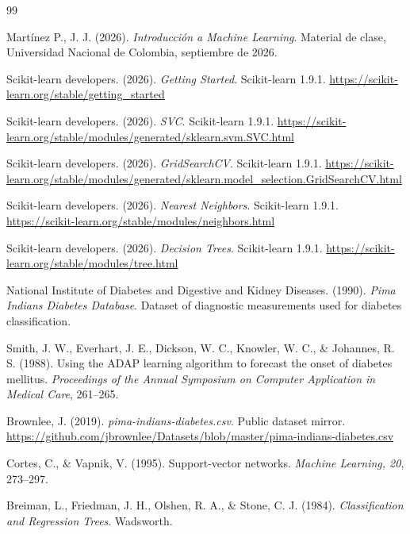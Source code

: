 \documentclass[14pt,twoside]{article}
\begin{document}
{\small
\begin{thebibliography}{99}

Martínez P., J. J. (2026). \textit{Introducción a Machine Learning}. Material de clase, Universidad Nacional de Colombia, septiembre de 2026.

Scikit-learn developers. (2026). \textit{Getting Started}. Scikit-learn 1.9.1. \url{https://scikit-learn.org/stable/getting_started}

Scikit-learn developers. (2026). \textit{SVC}. Scikit-learn 1.9.1. \url{https://scikit-learn.org/stable/modules/generated/sklearn.svm.SVC.html}

Scikit-learn developers. (2026). \textit{GridSearchCV}. Scikit-learn 1.9.1. \url{https://scikit-learn.org/stable/modules/generated/sklearn.model_selection.GridSearchCV.html}

Scikit-learn developers. (2026). \textit{Nearest Neighbors}. Scikit-learn 1.9.1. \url{https://scikit-learn.org/stable/modules/neighbors.html}

Scikit-learn developers. (2026). \textit{Decision Trees}. Scikit-learn 1.9.1. \url{https://scikit-learn.org/stable/modules/tree.html}

National Institute of Diabetes and Digestive and Kidney Diseases. (1990). \textit{Pima Indians Diabetes Database}. Dataset of diagnostic measurements used for diabetes classification.

Smith, J. W., Everhart, J. E., Dickson, W. C., Knowler, W. C., \& Johannes, R. S. (1988). Using the ADAP learning algorithm to forecast the onset of diabetes mellitus. \textit{Proceedings of the Annual Symposium on Computer Application in Medical Care}, 261--265.

Brownlee, J. (2019). \textit{pima-indians-diabetes.csv}. Public dataset mirror. \url{https://github.com/jbrownlee/Datasets/blob/master/pima-indians-diabetes.csv}

Cortes, C., \& Vapnik, V. (1995). Support-vector networks. \textit{Machine Learning, 20}, 273--297.

Breiman, L., Friedman, J. H., Olshen, R. A., \& Stone, C. J. (1984). \textit{Classification and Regression Trees}. Wadsworth.

\end{thebibliography}
}
\end{document}
